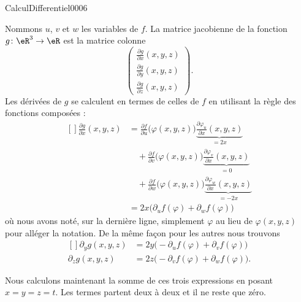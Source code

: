 \begin{corrige}{CalculDifferentiel0006}

	Nommons $u$, $v$ et $w$ les variables de $f$. La matrice jacobienne de la fonction $g\colon \eR^3\to \eR$ est la matrice colonne
	\begin{equation}
		\begin{pmatrix}
			\displaystyle\frac{ \partial g }{ \partial x }(x,y,z)	\\ 
			\displaystyle\frac{ \partial g }{ \partial y }(x,y,z)	\\ 
			\displaystyle\frac{ \partial g }{ \partial z }(x,y,z)	
		\end{pmatrix}.
	\end{equation}
	Les dérivées de $g$ se calculent en termes de celles de $f$ en utilisant la règle des fonctions composées :
	\begin{equation}
		\begin{aligned}[]
			\frac{ \partial g }{ \partial x }(x,y,z)&=\frac{ \partial f }{ \partial u }\big( \varphi(x,y,z) \big)\underbrace{\frac{ \partial \varphi_u }{ \partial x }(x,y,z)}_{=2x}\\
			&\quad+\frac{ \partial f }{ \partial v }\big( \varphi(x,y,z) \big)\underbrace{\frac{ \partial \varphi_v }{ \partial x }(x,y,z)}_{=0}\\
			&\quad+\frac{ \partial f }{ \partial w }\big( \varphi(x,y,z) \big)\underbrace{\frac{ \partial \varphi_w }{ \partial x }(x,y,z)}_{=-2x}\\
			&=2x\big( \partial_uf(\varphi)+\partial_wf(\varphi) \big)
		\end{aligned}
	\end{equation}
	où nous avons noté, sur la dernière ligne, simplement $\varphi$ au lieu de $\varphi(x,y,z)$ pour alléger la notation. De la même façon pour les autres nous trouvons
	\begin{equation}
		\begin{aligned}[]
			\partial_yg(x,y,z)&=2y\big( -\partial_uf(\varphi)+\partial_vf(\varphi) \big)\\
			\partial_zg(x,y,z)&=2z\big( -\partial_vf(\varphi)+\partial_wf(\varphi) \big).
		\end{aligned}
	\end{equation}
	
	Nous calculons maintenant la somme de ces trois expressions en posant $x=y=z=t$. Les termes partent deux à deux et il ne reste que zéro.
\end{corrige}
